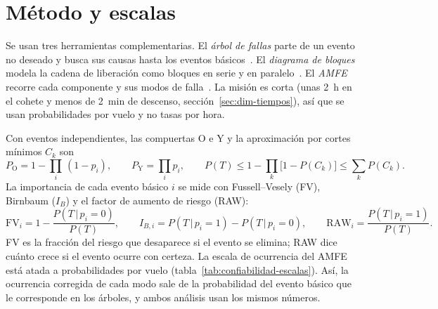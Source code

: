 \section{Método y escalas}\label{sec:confiabilidad-metodo}
Se usan tres herramientas complementarias. El \emph{árbol de fallas} parte de un evento
no deseado y busca sus causas hasta los eventos básicos~\cite{confiabilidad-vesely1981,
confiabilidad-stamatelatos2002}. El \emph{diagrama de bloques} modela la cadena de
liberación como bloques en serie y en paralelo~\cite{confiabilidad-iec61078}. El
\emph{AMFE} recorre cada componente y sus modos de falla~\cite{confiabilidad-iec60812}.
La misión es corta (unas \SI{2}{h} en el cohete y menos de \SI{2}{min} de descenso, sección~\ref{sec:dim-tiempos}), así que se
usan probabilidades por vuelo y no tasas por hora.

Con eventos independientes, las compuertas O e Y y la aproximación por cortes mínimos
$C_k$ son~\cite{confiabilidad-rausand2004}
\begin{equation}
  P_{\mathrm{O}} = 1-\prod_i\,(1-p_i),\qquad P_{\mathrm{Y}}=\prod_i p_i,\qquad
  P(T)\le 1-\prod_k\bigl[1-P(C_k)\bigr]\le\sum_k P(C_k).
  \label{eq:confiabilidad-compuertas}
\end{equation}
La importancia de cada evento básico $i$ se mide con Fussell--Vesely (FV), Birnbaum
($I_B$) y el factor de aumento de riesgo (RAW):
\begin{equation}
  \mathrm{FV}_i = 1-\frac{P(T\,|\,p_i=0)}{P(T)},\qquad
  I_{B,i}=P(T\,|\,p_i=1)-P(T\,|\,p_i=0),\qquad
  \mathrm{RAW}_i=\frac{P(T\,|\,p_i=1)}{P(T)}.
  \label{eq:confiabilidad-importancia}
\end{equation}
FV es la fracción del riesgo que desaparece si el evento se elimina; RAW dice cuánto
crece si el evento ocurre con certeza. La escala de ocurrencia del AMFE está atada a
probabilidades por vuelo (tabla~\ref{tab:confiabilidad-escalas}). Así, la ocurrencia
corregida de cada modo sale de la probabilidad del evento básico que le corresponde en
los árboles, y ambos análisis usan los mismos números.

